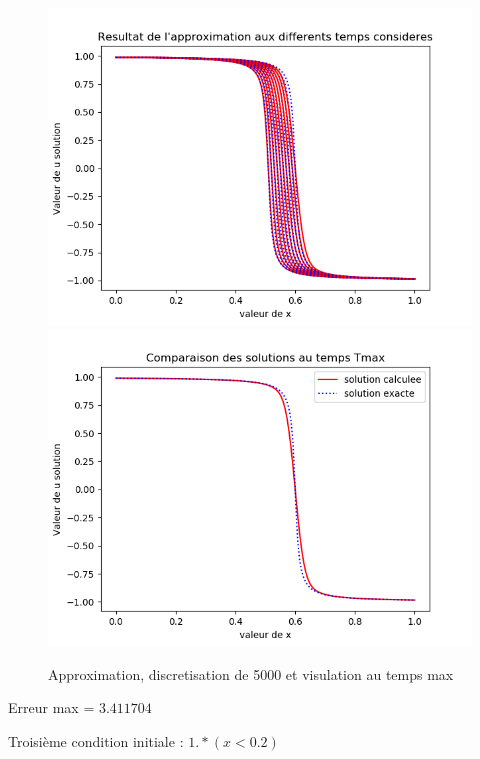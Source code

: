 \documentclass[12pt]{article}
\begin{document}
\begin{figure}[H]
	\centering
	\includegraphics[scale=0.40]{1D_c1_5000_s5_i2.png}
	\includegraphics[scale=0.40]{Temp_max_c1_5000_s5_init2.png}
	\caption{Approximation, discretisation de 5000 et visulation au temps max}
	\label{1D}
	\end{figure}
Erreur max = $3.411704$

Troisième condition initiale : $1.*(x<0.2)$
\end{document}
